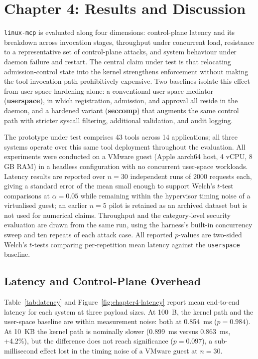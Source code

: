 \section*{Chapter 4: Results and Discussion}
\setcounter{section}{4} \setcounter{subsection}{0}
 \label{chap:evaluation} 

\texttt{linux-mcp} is evaluated along four dimensions: control-plane latency and its breakdown across invocation stages, throughput under concurrent load, resistance to a representative set of control-plane attacks, and system behaviour under daemon failure and restart.
The central claim under test is that relocating admission-control state into the kernel strengthens enforcement without making the tool invocation path prohibitively expensive.
Two baselines isolate this effect from user-space hardening alone: a conventional user-space mediator (\textbf{userspace}), in which registration, admission, and approval all reside in the daemon, and a hardened variant (\textbf{seccomp}) that augments the same control path with stricter syscall filtering, additional validation, and audit logging.

The prototype under test comprises 43 tools across 14 applications; all three systems operate over this same tool deployment throughout the evaluation.
All experiments were conducted on a VMware guest (Apple aarch64 host, 4 vCPU, 8 GB RAM) in a headless configuration with no concurrent user-space workloads.
Latency results are reported over $n = 30$ independent runs of 2000 requests each, giving a standard error of the mean small enough to support Welch's $t$-test comparisons at $\alpha = 0.05$ while remaining within the hypervisor timing noise of a virtualised guest; an earlier $n = 5$ pilot is retained as an archived dataset but is not used for numerical claims.
Throughput and the category-level security evaluation are drawn from the same run, using the harness's built-in concurrency sweep and ten repeats of each attack case.
All reported $p$-values are two-sided Welch's $t$-tests \cite{west2021welch} comparing per-repetition mean latency against the \texttt{userspace} baseline.


\subsection{Latency and Control-Plane Overhead}

Table~\ref{tab:latency} and Figure~\ref{fig:chapter4-latency} report mean end-to-end latency for each system at three payload sizes.
At 100~B, the kernel path and the user-space baseline are within measurement noise: both at \num{0.854}~ms ($p = 0.984$).
At 10~KB the kernel path is nominally slower (\num{0.899}~ms versus \num{0.863}~ms, +4.2\%), but the difference does not reach significance ($p = 0.097$), a sub-millisecond effect lost in the timing noise of a VMware guest at $n = 30$.

